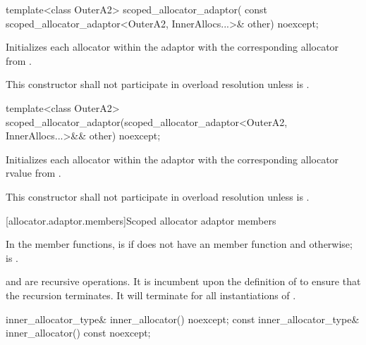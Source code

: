 %
\begin{itemdecl}
template<class OuterA2>
  scoped_allocator_adaptor(
    const scoped_allocator_adaptor<OuterA2, InnerAllocs...>& other) noexcept;
\end{itemdecl}

\begin{itemdescr}
\pnum
\effects Initializes each allocator within the adaptor with the corresponding allocator
from .

\pnum
\remarks This constructor shall not participate in overload resolution unless
 is .
\end{itemdescr}

%
\begin{itemdecl}
template<class OuterA2>
  scoped_allocator_adaptor(scoped_allocator_adaptor<OuterA2, InnerAllocs...>&& other) noexcept;
\end{itemdecl}

\begin{itemdescr}
\pnum
\effects Initializes each allocator within the adaptor with the corresponding allocator rvalue
from .

\pnum
\remarks This constructor shall not participate in overload resolution unless
 is .
\end{itemdescr}

[allocator.adaptor.members]{Scoped allocator adaptor members}

\pnum
In the  member functions,
 is  if  does not have an
 member function and
otherwise;
 is
.
\begin{note}  and
 are recursive operations. It
is incumbent upon the definition of  to ensure that the
recursion terminates. It will terminate for all instantiations of
. \end{note}

%
\begin{itemdecl}
inner_allocator_type& inner_allocator() noexcept;
const inner_allocator_type& inner_allocator() const noexcept;
\end{itemdecl}

